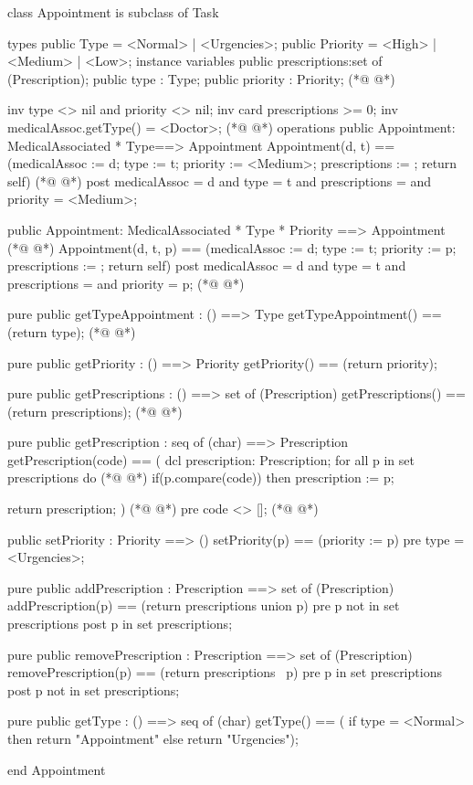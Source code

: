 \begin{vdmpp}[breaklines=true]
class Appointment is subclass of Task

types
 public Type = <Normal> | <Urgencies>;
 public Priority = <High> | <Medium> | <Low>;
instance variables
  public prescriptions:set of (Prescription);
  public type : Type;
  public priority : Priority;
(*@
\label{Appointment:10}
@*)
  
  inv type <> nil and priority <> nil;
  inv card prescriptions >= 0;
  inv medicalAssoc.getType() = <Doctor>;
(*@
\label{getDoctorAppointment:14}
@*)
operations
 public Appointment: MedicalAssociated * Type==> Appointment
  Appointment(d, t) == (medicalAssoc := d; type := t; priority := <Medium>; prescriptions := {}; return self)
(*@
\label{getPrescriptions:17}
@*)
 post medicalAssoc = d and type = t and prescriptions = {} and priority = <Medium>;
 
 public Appointment: MedicalAssociated * Type * Priority ==> Appointment
(*@
\label{getPrescription:20}
@*)
  Appointment(d, t, p) == (medicalAssoc := d; type := t; priority := p; prescriptions := {}; return self)
 post medicalAssoc = d and type = t and prescriptions = {} and priority = p;
(*@
\label{getTypeAppointment:22}
@*)
 
 pure public getTypeAppointment : () ==> Type
  getTypeAppointment() == (return type);
(*@
\label{getPriority:25}
@*)
  
 pure public getPriority : () ==> Priority
  getPriority() == (return priority);
 
  pure public getPrescriptions : () ==> set of (Prescription)
   getPrescriptions() == (return prescriptions);
(*@
\label{addPrescription:31}
@*)
   
  pure public getPrescription : seq of (char) ==> Prescription
   getPrescription(code) == (
                dcl prescription: Prescription;
                 for all p in set prescriptions do
(*@
\label{removePrescription:36}
@*)
                  if(p.compare(code))
                   then prescription := p;
                 
                 return prescription;
                )
(*@
\label{getType:41}
@*)
  pre code <> [];
(*@
\label{setPriority:42}
@*)
  
  public setPriority : Priority ==> ()
   setPriority(p) == (priority := p)
  pre type = <Urgencies>;
  
  pure public addPrescription : Prescription ==> set of (Prescription)
   addPrescription(p) == (return prescriptions union {p})
  pre p not in set prescriptions
  post p in set prescriptions;
                 
 pure public removePrescription : Prescription ==> set of (Prescription)
   removePrescription(p) == (return prescriptions \ {p})
  pre p in set prescriptions
  post p not in set prescriptions;
  
 pure public getType : () ==> seq of (char) 
  getType() == (
          if type = <Normal> 
           then return "Appointment"
          else
           return "Urgencies");
   
end Appointment
\end{vdmpp}
